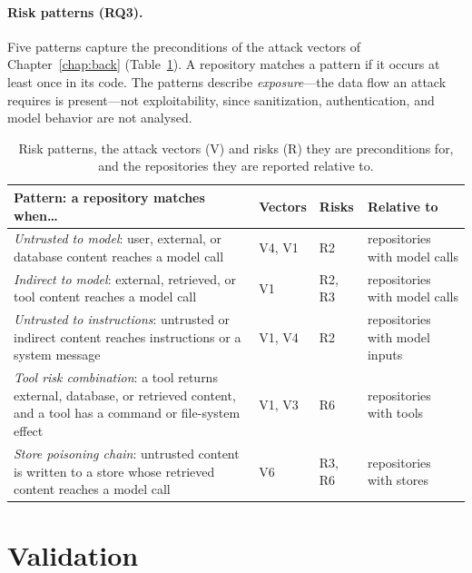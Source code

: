 \paragraph{Risk patterns (RQ3).} Five patterns capture the preconditions of the attack vectors of Chapter~\ref{chap:back} (Table~\ref{tab:df-patterns}). A repository matches a pattern if it occurs at least once in its code. The patterns describe \emph{exposure}---the data flow an attack requires is present---not exploitability, since sanitization, authentication, and model behavior are not analysed.

\begin{table}[t]
\centering
\footnotesize
\renewcommand{\arraystretch}{1.25}
\setlength{\tabcolsep}{4pt}
\caption{Risk patterns, the attack vectors (V) and risks (R) they are preconditions for, and the repositories they are reported relative to.}
\label{tab:df-patterns}
\begin{tabular}{@{}>{\raggedright\arraybackslash}p{}>{\raggedright\arraybackslash}p{}>{\raggedright\arraybackslash}p{}>{\raggedright\arraybackslash}p{}@{}}
\toprule
\textbf{Pattern: a repository matches when\ldots} & \textbf{Vectors} & \textbf{Risks} & \textbf{Relative to} \\
\midrule
\emph{Untrusted to model}: user, external, or database content reaches a model call & V4, V1 & R2 & repositories with model calls \\
\emph{Indirect to model}: external, retrieved, or tool content reaches a model call & V1 & R2, R3 & repositories with model calls \\
\emph{Untrusted to instructions}: untrusted or indirect content reaches instructions or a system message & V1, V4 & R2 & repositories with model inputs \\
\emph{Tool risk combination}: a tool returns external, database, or retrieved content, and a tool has a command or file-system effect & V1, V3 & R6 & repositories with tools \\
\emph{Store poisoning chain}: untrusted content is written to a store whose retrieved content reaches a model call & V6 & R3, R6 & repositories with stores \\
\bottomrule
\end{tabular}
\end{table}

\section{Validation}
\label{sec:df-validation}

